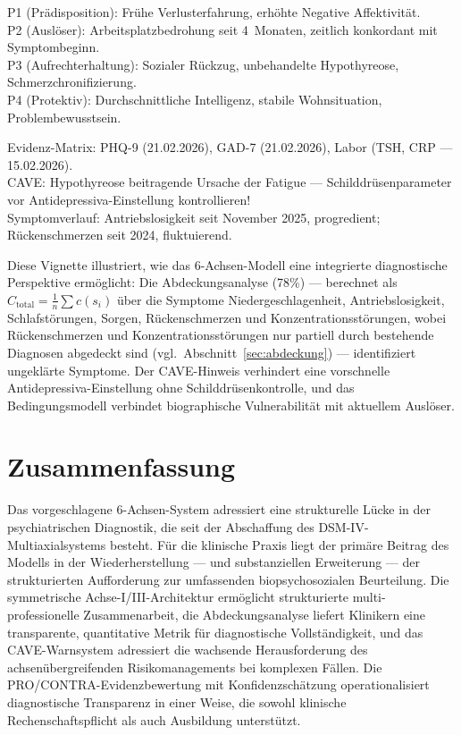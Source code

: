 \documentclass[11pt,a4paper]{article}
\begin{document}
\begin{description}[style=nextline, leftmargin=1.5cm, font=\bfseries\small]
\item[Achse~V (Bedingungsmodell)]
P1 (Pr\"adisposition): Fr\"uhe Verlusterfahrung, erh\"ohte Negative Affektivit\"at. \\
P2 (Ausl\"oser): Arbeitsplatzbedrohung seit 4~Monaten, zeitlich konkordant mit Symptombeginn. \\
P3 (Aufrechterhaltung): Sozialer R\"uckzug, unbehandelte Hypothyreose, Schmerzchronifizierung. \\
P4 (Protektiv): Durchschnittliche Intelligenz, stabile Wohnsituation, Problembewusstsein.
\item[Achse~VI (Belegsammlung)]
Evidenz-Matrix: PHQ-9 (21.02.2026), GAD-7 (21.02.2026), Labor (TSH, CRP --- 15.02.2026). \\
CAVE: Hypothyreose beitragende Ursache der Fatigue --- Schilddr\"usenparameter vor Antidepressiva-Einstellung kontrollieren! \\
Symptomverlauf: Antriebslosigkeit seit November 2025, progredient; R\"uckenschmerzen seit 2024, fluktuierend.
\end{description}

\noindent Diese Vignette illustriert, wie das 6-Achsen-Modell eine integrierte diagnostische Perspektive erm\"oglicht: Die Abdeckungsanalyse (78\%) --- berechnet als $C_{\text{total}} = \frac{1}{n} \sum c(s_i)$ \"uber die Symptome Niedergeschlagenheit, Antriebslosigkeit, Schlafst\"orungen, Sorgen, R\"uckenschmerzen und Konzentrationsst\"orungen, wobei R\"uckenschmerzen und Konzentrationsst\"orungen nur partiell durch bestehende Diagnosen abgedeckt sind (vgl.\ Abschnitt~\ref{sec:abdeckung}) --- identifiziert ungekl\"arte Symptome. Der CAVE-Hinweis verhindert eine vorschnelle Antidepressiva-Einstellung ohne Schilddr\"usenkontrolle, und das Bedingungsmodell verbindet biographische Vulnerabilit\"at mit aktuellem Ausl\"oser.


\section{Zusammenfassung}
\label{sec:zusammenfassung}

Das vorgeschlagene 6-Achsen-System adressiert eine strukturelle L\"ucke in der psychiatrischen Diagnostik, die seit der Abschaffung des DSM-IV-Multiaxialsystems besteht. F\"ur die klinische Praxis liegt der prim\"are Beitrag des Modells in der Wiederherstellung --- und substanziellen Erweiterung --- der strukturierten Aufforderung zur umfassenden biopsychosozialen Beurteilung. Die symmetrische Achse-I/III-Architektur erm\"oglicht strukturierte multi-professionelle Zusammenarbeit, die Abdeckungsanalyse liefert Klinikern eine transparente, quantitative Metrik f\"ur diagnostische Vollst\"andigkeit, und das CAVE-Warnsystem adressiert die wachsende Herausforderung des achsen\"ubergreifenden Risikomanagements bei komplexen F\"allen. Die PRO/CONTRA-Evidenzbewertung mit Konfidenzsch\"atzung operationalisiert diagnostische Transparenz in einer Weise, die sowohl klinische Rechenschaftspflicht als auch Ausbildung unterst\"utzt.
\end{document}
